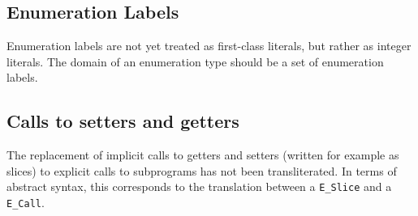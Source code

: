 \documentclass{book}
\begin{document}
\subsection{Enumeration Labels}
Enumeration labels are not yet treated as first-class literals, but rather as integer literals.
The domain of an enumeration type should be a set of enumeration labels.










\subsection{Calls to setters and getters}
The replacement of implicit calls to getters and setters (written for example as
slices) to explicit calls to subprograms has not been transliterated.
%
In terms of abstract syntax, this corresponds to the translation between a
\texttt{E\_Slice} and a \texttt{E\_Call}.
\end{document}
